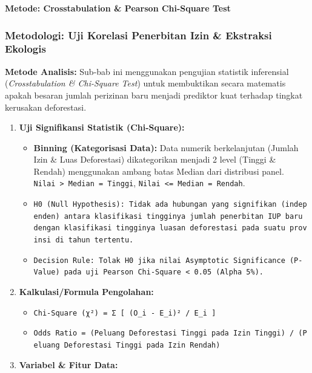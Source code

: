 \documentclass[
]{article}
\providecommand{\tightlist}{%
  \setlength{\itemsep}{0pt}\setlength{\parskip}{0pt}}
\begin{document}
\textbf{Metode: Crosstabulation \& Pearson Chi-Square Test}

\subsubsection{Metodologi: Uji Korelasi Penerbitan Izin \& Ekstraksi
Ekologis}\label{metodologi-uji-korelasi-penerbitan-izin-ekstraksi-ekologis}

\textbf{Metode Analisis:} Sub-bab ini menggunakan pengujian statistik
inferensial (\emph{Crosstabulation \& Chi-Square Test}) untuk
membuktikan secara matematis apakah besaran jumlah perizinan baru
menjadi prediktor kuat terhadap tingkat kerusakan deforestasi.

\begin{enumerate}
\def\labelenumi{\arabic{enumi}.}
\tightlist
\item
  \textbf{Uji Signifikansi Statistik (Chi-Square):}

  \begin{itemize}
  \tightlist
  \item
    \textbf{Binning (Kategorisasi Data):} Data numerik berkelanjutan
    (Jumlah Izin \& Luas Deforestasi) dikategorikan menjadi 2 level
    (Tinggi \& Rendah) menggunakan ambang batas Median dari distribusi
    panel. \texttt{Nilai\ \textgreater{}\ Median\ =\ Tinggi},
    \texttt{Nilai\ \textless{}=\ Median\ =\ Rendah}.
  \item
    \texttt{H0\ (Null\ Hypothesis):\ Tidak\ ada\ hubungan\ yang\ signifikan\ (independen)\ antara\ klasifikasi\ tingginya\ jumlah\ penerbitan\ IUP\ baru\ dengan\ klasifikasi\ tingginya\ luasan\ deforestasi\ pada\ suatu\ provinsi\ di\ tahun\ tertentu.}
  \item
    \texttt{Decision\ Rule:\ Tolak\ H0\ jika\ nilai\ Asymptotic\ Significance\ (P-Value)\ pada\ uji\ Pearson\ Chi-Square\ \textless{}\ 0.05\ (Alpha\ 5\%).}
  \end{itemize}
\item
  \textbf{Kalkulasi/Formula Pengolahan:}

  \begin{itemize}
  \tightlist
  \item
    \texttt{Chi-Square\ (χ²)\ =\ Σ\ {[}\ (O\_i\ -\ E\_i)²\ /\ E\_i\ {]}}
  \item
    \texttt{Odds\ Ratio\ =\ (Peluang\ Deforestasi\ Tinggi\ pada\ Izin\ Tinggi)\ /\ (Peluang\ Deforestasi\ Tinggi\ pada\ Izin\ Rendah)}
  \end{itemize}
\item
  \textbf{Variabel \& Fitur Data:}


\end{enumerate}
\end{document}
